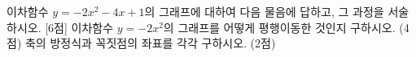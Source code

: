 이차함수 $y=-2x^2-4x+1$의 그래프에 대하여 다음 물음에 답하고, 그 과정을 서술하시오. \mbox{[6점]}
 이차함수 $y=-2x^2$의 그래프를 어떻게 평행이동한 것인지 구하시오. (4점)
 축의 방정식과 꼭짓점의 좌표를 각각 구하시오. (2점)
